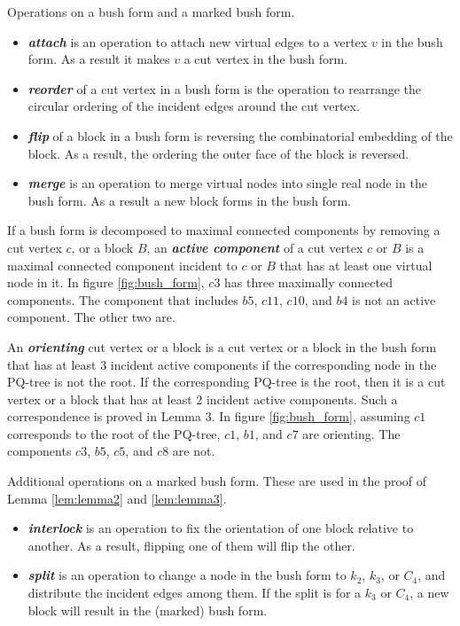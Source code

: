\documentclass[a4]{jgaa-art}
\newenvironment{definition}[1][Definition]{\begin{trivlist}
\item[\hskip \labelsep {\bfseries #1}]}{\end{trivlist}}
\begin{document}
\begin{definition}
Operations on a bush form and a marked bush form.
\begin{itemize}
\item {\bf \emph{attach}} is an operation to attach new virtual edges to a vertex $v$ in the bush form.
As a result it makes $v$ a cut vertex in the bush form.
\item {\bf \emph{reorder}} of a cut vertex in a bush form is the operation to rearrange the circular ordering of
the incident edges around the cut vertex.
\item {\bf \emph{flip}} of a block in a bush form is reversing the combinatorial embedding of the block.
As a result, the ordering the outer face of the block is reversed.
\item {\bf \emph{merge}} is an operation to merge virtual nodes into single real node in the bush form. As a result a new
block forms in the bush form.
\end{itemize}
\end{definition}

\begin{definition}
If a bush form is decomposed to maximal connected components by removing a cut vertex $c$, or a block $B$,
an {\bf \emph{active component}} of a cut vertex $c$ or $B$ is a maximal connected component incident 
to $c$ or $B$ that has at least one virtual node in it. 
In figure \ref{fig:bush_form}, $c3$ has three maximally connected components.
The component that includes $b5$, $c11$, $c10$, and $b4$ is not an active component. The other two are.
\end{definition}

\begin{definition}
An {\bf \emph{orienting}} cut vertex or a block is a cut vertex or a block in the bush form that has at least 3 incident
active components if the corresponding node in the PQ-tree is not the root.
If the corresponding PQ-tree is the root, then it is a cut vertex or a block that has at least 2 incident active 
components. Such a correspondence is proved in Lemma 3.
In figure \ref{fig:bush_form}, assuming $c1$ corresponds to the root of the PQ-tree, $c1$, $b1$, and $c7$
are orienting.
The components $c3$, $b5$, $c5$, and $c8$ are not.
\end{definition}

\begin{definition}
Additional operations on a marked bush form. These are used in the proof of Lemma \ref{lem:lemma2} and 
\ref{lem:lemma3}.
\begin{itemize}
\item {\bf \emph{interlock}} is an operation to fix the orientation of 
one block relative to another. As a result, flipping one of them will flip the other.
\item {\bf \emph{split}} is an operation to change a node in the bush form to $k_2$, $k_3$, or $C_4$,
and distribute the incident edges among them. If the split is for a $k_3$ or $C_4$, 
a new block will result in the (marked) bush form.
\end{itemize}
\end{definition}
\end{document}
